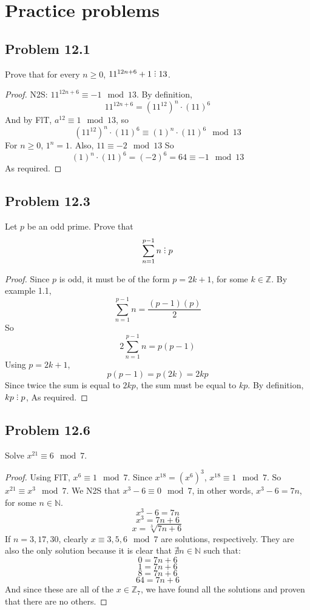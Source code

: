 \documentclass[12pt]{article}
\title{\scalebox{2}{Math 341 Homework 11}}
\author{\scalebox{1.5}{Theo Koss}}
\date{December 2020}
\newcommand{\N}{\mathbb{N}}
\newcommand{\Z}{\mathbb{Z}}
\newcommand{\divby}{%
  \mathrel{\text{\vbox{\baselineskip.65ex\lineskiplimit0pt\hbox{.}\hbox{.}\hbox{.}}}}%
  }
\begin{document}
\maketitle
\section{Practice problems}
\subsection{Problem 12.1}
Prove that for every $n\geq0$, $11^{12n+6}+1\divby13$.
\begin{proof}
N2S: $11^{12n+6}\equiv-1\mod{13}$. By definition, $$11^{12n+6}=(11^{12})^n\cdot(11)^6$$ And by FlT, $a^{12}\equiv1\mod{13}$, so $$(11^{12})^n\cdot(11)^6\equiv(1)^n\cdot(11)^6\mod{13}$$ For $n\geq0$, $1^n=1$. Also, $11\equiv-2\mod{13}$ So $$(1)^n\cdot(11)^6=(-2)^6=64\equiv-1\mod{13}$$ As required.
\end{proof}
\subsection{Problem 12.3}
Let $p$ be an odd prime. Prove that $$\sum_{n=1}^{p-1}n\divby p$$
\begin{proof}
Since $p$ is odd, it must be of the form $p=2k+1$, for some $k\in\Z$. By example 1.1, $$\sum_{n=1}^{p-1}n=\frac{(p-1)(p)}{2}$$ So $$2\sum_{n=1}^{p-1}n=p(p-1)$$ Using $p=2k+1$, $$p(p-1)=p(2k)=2kp$$ Since twice the sum is equal to $2kp$, the sum must be equal to $kp$. By definition, $kp\divby p$, As required.
\end{proof}
\subsection{Problem 12.6}
Solve $x^{21}\equiv6\mod{7}$.
\begin{proof} Using FlT, $x^{6}\equiv1\mod{7}$. Since $x^{18}=(x^{6})^3$, $x^{18}\equiv1\mod{7}$. So $x^{21}\equiv x^3\mod{7}$. \newline We N2S that $x^3-6\equiv0\mod{7}$, in other words, $x^3-6=7n$, for some $n\in\N$. $$x^3-6=7n$$ $$x^3=7n+6$$ $$x=\sqrt[3]{7n+6}$$ If $n=3,17,30$, clearly $x\equiv3,5,6\mod{7}$ are solutions, respectively. They are also the only solution because it is clear that $\nexists n\in\N$ such that: 
$$0=7n+6$$ $$1=7n+6$$ $$8=7n+6$$ $$64=7n+6$$
And since these are all of the $x\in\Z_{7}$, we have found all the solutions and proven that there are no others.\end{proof}
\end{document}
